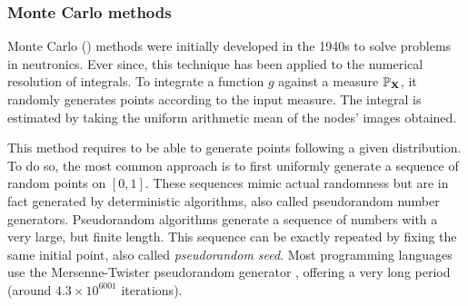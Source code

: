 \subsubsection{Monte Carlo methods}
Monte Carlo () methods were initially developed in the 1940s to solve problems in neutronics.  
Ever since, this technique has been applied to the numerical resolution of integrals. 
To integrate a function $g$ against a measure $\mathbb{P}_{{\bf X}}$, it randomly generates points according to the input measure. 
The integral is estimated by taking the uniform arithmetic mean of the nodes' images obtained. 

This method requires to be able to generate points following a given distribution. 
To do so, the most common approach is to first uniformly generate a sequence of random points on $[0, 1]$. 
These sequences mimic actual randomness but are in fact generated by deterministic algorithms, also called pseudorandom number generators. 
Pseudorandom algorithms generate a sequence of numbers with a very large, but finite length. 
This sequence can be exactly repeated by fixing the same initial point, also called \textit{pseudorandom seed}.
Most programming languages use the Mersenne-Twister pseudorandom generator \citep{matsumoto_1998}, offering a very long period (around $4.3\times10^{6001}$ iterations).


